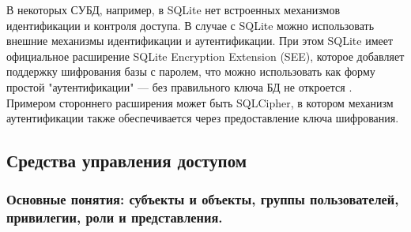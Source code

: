 В некоторых СУБД, например, в SQLite нет встроенных механизмов идентификации и контроля доступа. В случае с SQLite можно использовать внешние механизмы идентификации и аутентификации. При этом SQLite имеет официальное расширение SQLite Encryption Extension (SEE), которое добавляет поддержку шифрования базы с паролем, что можно использовать как форму простой "аутентификации" — без правильного ключа БД не откроется \cite{SEE}. Примером стороннего расширения может быть SQLCipher\cite{SQLCipher-auth}, в котором механизм аутентификации также обеспечивается через предоставление ключа шифрования.


\subsection{Средства управления доступом}
\subsubsection{Основные понятия: субъекты и объекты, группы пользователей, привилегии, роли и представления.}

